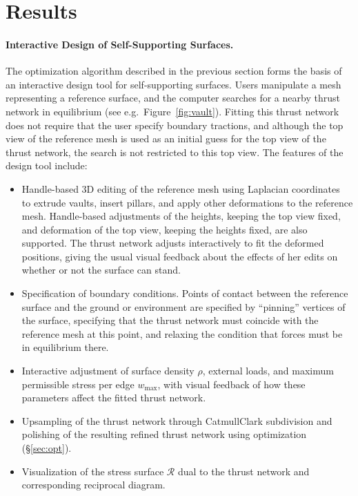 \documentclass[review]{acmsiggraph}
\def\RR{{\mathcal R}}
\newcommand{\secref}[1]{(\S\ref{#1})}
\begin{document}
\section{Results}
\label{sec:design}

\paragraph{Interactive Design of Self-Supporting Surfaces.}

The optimization algorithm described in the previous section forms the 
basis of an interactive design tool for self-supporting surfaces. Users 
manipulate a mesh representing a reference surface, and the computer 
searches for a nearby thrust network in equilibrium (see e.g.\ 
Figure~\ref{fig:vault}). Fitting this thrust network does not require that 
the user specify boundary tractions, and although the top view of the 
reference mesh is used as an initial guess for the top view of the thrust 
network, the search is not restricted to this top view. The features of 
the design tool include:

\begin{itemize}\itemsep-\parsep

\item Handle-based 3D editing of the reference mesh using Laplacian 
coordinates~\cite{Lipman2004,Sorkine2003} to extrude vaults, insert 
pillars, and apply other deformations to the reference mesh. Handle-based 
adjustments of the heights, keeping the top view fixed, and deformation of 
the top view, keeping the heights fixed, are also supported. The thrust 
network adjusts interactively to fit the deformed positions, giving the 
usual visual feedback about the effects of her edits on whether or not the 
surface can stand.

\item Specification of boundary conditions. Points of contact between the 
reference surface and the ground or environment are specified by 
``pinning'' vertices of the surface, specifying that the thrust network 
must coincide with the reference mesh at this point, and relaxing the 
condition that forces must be in equilibrium there.

\item Interactive adjustment of surface density $\rho$, external loads, 
and maximum permissible stress per edge $w_{\textrm{max}}$, with visual 
feedback of how these parameters affect the fitted thrust network.

\item Upsampling of the thrust network through Catmull\dash Clark 
subdivision \nix{\cite{catmull78}}
and polishing of the resulting refined thrust 
network using optimization \secref{sec:opt}.

\item Visualization of the stress surface $\RR$ dual to the thrust network 
and corresponding reciprocal diagram.

\end{itemize}
\end{document}
